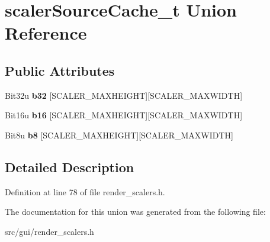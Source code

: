 \hypertarget{unionscalerSourceCache__t}{\section{scaler\-Source\-Cache\-\_\-t Union Reference}
\label{unionscalerSourceCache__t}
}
\subsection*{Public Attributes}
\begin{DoxyCompactItemize}
\item 
\hypertarget{unionscalerSourceCache__t_afd49a820312dea0cf5e2e5ab05994154}{Bit32u {\bfseries b32} \mbox{[}S\-C\-A\-L\-E\-R\-\_\-\-M\-A\-X\-H\-E\-I\-G\-H\-T\mbox{]}\mbox{[}S\-C\-A\-L\-E\-R\-\_\-\-M\-A\-X\-W\-I\-D\-T\-H\mbox{]}}\label{unionscalerSourceCache__t_afd49a820312dea0cf5e2e5ab05994154}

\item 
\hypertarget{unionscalerSourceCache__t_a53d012723435059dfaff1354d7e15dd5}{Bit16u {\bfseries b16} \mbox{[}S\-C\-A\-L\-E\-R\-\_\-\-M\-A\-X\-H\-E\-I\-G\-H\-T\mbox{]}\mbox{[}S\-C\-A\-L\-E\-R\-\_\-\-M\-A\-X\-W\-I\-D\-T\-H\mbox{]}}\label{unionscalerSourceCache__t_a53d012723435059dfaff1354d7e15dd5}

\item 
\hypertarget{unionscalerSourceCache__t_a4d913980d175a8c341b7bc957a9e2938}{Bit8u {\bfseries b8} \mbox{[}S\-C\-A\-L\-E\-R\-\_\-\-M\-A\-X\-H\-E\-I\-G\-H\-T\mbox{]}\mbox{[}S\-C\-A\-L\-E\-R\-\_\-\-M\-A\-X\-W\-I\-D\-T\-H\mbox{]}}\label{unionscalerSourceCache__t_a4d913980d175a8c341b7bc957a9e2938}

\end{DoxyCompactItemize}


\subsection{Detailed Description}


Definition at line 78 of file render\-\_\-scalers.\-h.



The documentation for this union was generated from the following file\-:\begin{DoxyCompactItemize}
\item 
src/gui/render\-\_\-scalers.\-h\end{DoxyCompactItemize}
